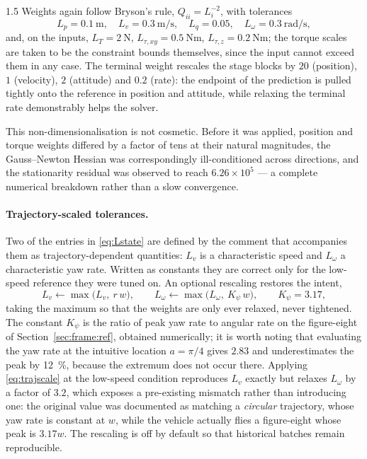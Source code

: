 \begin{spacing}{1.5}
Weights again follow Bryson's rule, $Q_{ii}=L_i^{-2}$, with tolerances
\begin{equation}
L_p=\SI{0.1}{\meter},\quad
L_v=\SI{0.3}{\meter\per\second},\quad
L_q=0.05,\quad
L_\omega=\SI{0.3}{\radian\per\second},
\label{eq:Lstate}
\end{equation}
and, on the inputs,
$L_T=\SI{2}{\newton}$, $L_{\tau,xy}=\SI{0.5}{\newton\meter}$,
$L_{\tau,z}=\SI{0.2}{\newton\meter}$; the torque scales are taken to be the
constraint bounds themselves, since the input cannot exceed them in any case. The
terminal weight rescales the stage blocks by $20$ (position), $1$ (velocity), $2$
(attitude) and $0.2$ (rate): the endpoint of the prediction is pulled tightly
onto the reference in position and attitude, while relaxing the terminal rate
demonstrably helps the solver.

This non-dimensionalisation is not cosmetic. Before it was applied, position and
torque weights differed by a factor of tens at their natural magnitudes, the
Gauss--Newton Hessian was correspondingly ill-conditioned across directions, and
the stationarity residual was observed to reach $6.26\times10^{5}$ --- a complete
numerical breakdown rather than a slow convergence.

\paragraph{Trajectory-scaled tolerances.} Two of the entries in \eqref{eq:Lstate}
are defined by the comment that accompanies them as trajectory-dependent
quantities: $L_v$ is a characteristic speed and $L_\omega$ a characteristic yaw
rate. Written as constants they are correct only for the low-speed reference they
were tuned on. An optional rescaling restores the intent,
\begin{equation}
L_v \leftarrow \max\bigl(L_v,\ r\,w\bigr),
\qquad
L_\omega \leftarrow \max\bigl(L_\omega,\ K_\psi\, w\bigr),
\qquad K_\psi = 3.17,
\label{eq:trajscale}
\end{equation}
taking the maximum so that the weights are only ever relaxed, never tightened.
The constant $K_\psi$ is the ratio of peak yaw rate to angular rate on the
figure-eight of Section~\ref{sec:frame:ref}, obtained numerically; it is worth
noting that evaluating the yaw rate at the intuitive location $a=\pi/4$ gives
$2.83$ and underestimates the peak by \SI{12}{\percent}, because the extremum
does not occur there. Applying \eqref{eq:trajscale} at the low-speed condition
reproduces $L_v$ exactly but relaxes $L_\omega$ by a factor of $3.2$, which
exposes a pre-existing mismatch rather than introducing one: the original value
was documented as matching a \emph{circular} trajectory, whose yaw rate is
constant at $w$, while the vehicle actually flies a figure-eight whose peak is
$3.17w$. The rescaling is off by default so that historical batches remain
reproducible.


\end{spacing}
